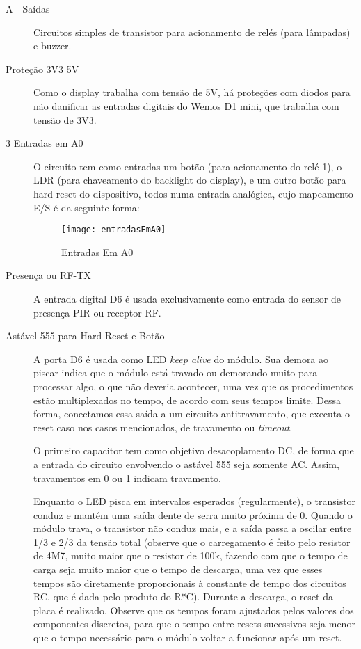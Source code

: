 \begin{description}
\item [A - Saídas] Circuitos simples de transistor para acionamento de relés (para lâmpadas) e buzzer.
\item [Proteção 3V3 5V] Como o display trabalha com tensão de 5V, há proteções com diodos para não danificar as entradas digitais do Wemos D1 mini, que trabalha com tensão de 3V3.
\item [3 Entradas em A0] O circuito tem como entradas um botão (para acionamento do relé 1), o LDR (para chaveamento do backlight do display), e um outro botão para hard reset do dispositivo, todos numa entrada analógica, cujo mapeamento E/S é da seguinte forma:

\begin{figure}[H]
	\centering
	\caption{Entradas Em A0}
  \texttt{[image: entradasEmA0]}
\label{fig:entradasEmA0}
\end{figure}

\item [Presença ou RF-TX] A entrada digital D6 é usada exclusivamente como entrada do sensor de presença PIR ou receptor RF.
\item [Astável 555 para Hard Reset e Botão] A porta D6 é usada como LED \textit{keep alive} do módulo. Sua demora ao piscar indica que o módulo está travado ou demorando muito para processar algo, o que não deveria acontecer, uma vez que os procedimentos estão multiplexados no tempo, de acordo com seus tempos limite. Dessa forma, conectamos essa saída a um circuito antitravamento, que executa o reset caso nos casos mencionados, de travamento ou \textit{timeout}.

O primeiro capacitor tem como objetivo desacoplamento DC, de forma que a entrada do circuito envolvendo o astável 555 seja somente AC. Assim, travamentos em 0 ou 1 indicam travamento.

Enquanto o LED pisca em intervalos esperados (regularmente), o transistor conduz e mantém uma saída dente de serra muito próxima de 0. Quando o módulo trava, o transistor não conduz mais, e a saída passa a oscilar entre 1/3 e 2/3 da tensão total (observe que o carregamento é feito pelo resistor de 4M7, muito maior que o resistor de 100k, fazendo com que o tempo de carga seja muito maior que o tempo de descarga, uma vez que esses tempos são diretamente proporcionais à constante de tempo dos circuitos RC, que é dada pelo produto do R*C). Durante a descarga, o reset da placa é realizado. Observe que os tempos foram ajustados pelos valores dos componentes discretos, para que o tempo entre resets sucessivos seja menor que o tempo necessário para o módulo voltar a funcionar após um reset.


\end{description}
